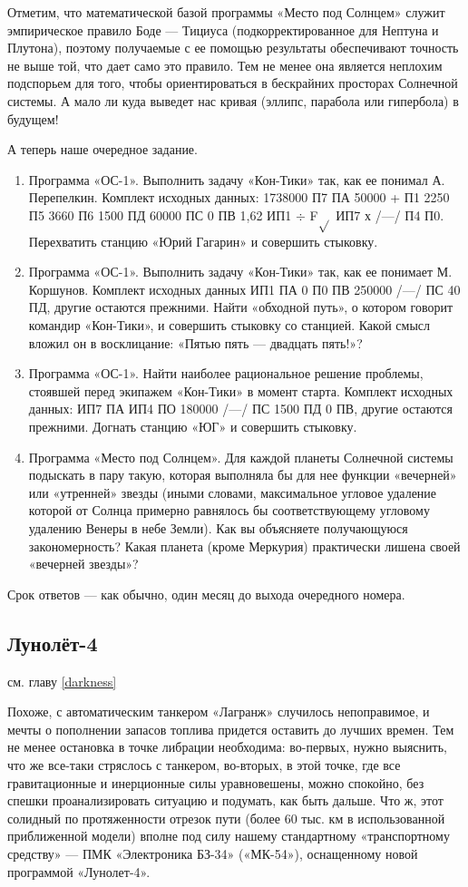\documentclass[11pt,a4paper,oneside]{article}
\begin{document}
Отметим, что математической базой программы «Место под Солнцем» служит эмпирическое правило Боде — Тициуса (подкорректированное для Нептуна и Плутона), поэтому получаемые с ее помощью результаты обеспечивают точность не выше той, что дает само это правило. Тем не менее она является неплохим подспорьем для того, чтобы ориентироваться в бескрайних просторах Солнечной системы. А мало ли куда выведет нас кривая (эллипс, парабола или гипербола) в будущем!

А теперь наше очередное задание.

\begin{enumerate}
\item Программа «ОС-1». Выполнить задачу «Кон-Тики» так, как ее понимал А. Перепелкин. Комплект исходных данных: 1738000 П7 ПА 50000 + П1 2250 П5 3660 П6 1500 ПД 60000 ПС 0 ПВ 1,62 ИП1 $\div$ F$\sqrt{}$ ИП7 х /—/ П4 П0. Перехватить станцию «Юрий Гагарин» и совершить стыковку.
\item Программа «ОС-1». Выполнить задачу «Кон-Тики» так, как ее понимает М. Коршунов. Комплект исходных данных ИП1 ПА 0 П0 ПВ 250000 /—/ ПС 40 ПД, другие остаются прежними. Найти «обходной путь», о котором говорит командир «Кон-Тики», и совершить стыковку со станцией. Какой смысл вложил он в восклицание: «Пятью пять — двадцать пять!»?
\item Программа «ОС-1». Найти наиболее рациональное решение проблемы, стоявшей перед экипажем «Кон-Тики» в момент старта. Комплект исходных данных: ИП7 ПА ИП4 ПО 180000 /—/ ПС 1500 ПД 0 ПВ, другие остаются прежними. Догнать станцию «ЮГ» и совершить стыковку.
\item Программа «Место под Солнцем». Для каждой планеты Солнечной системы подыскать в пару такую, которая выполняла бы для нее функции «вечерней» или «утренней» звезды (иными словами, максимальное угловое удаление которой от Солнца примерно равнялось бы соответствующему угловому удалению Венеры в небе Земли). Как вы объясняете получающуюся закономерность? Какая планета (кроме Меркурия) практически лишена своей «вечерней звезды»?
\end{enumerate}

Срок ответов — как обычно, один месяц до выхода очередного номера.

\subsection{Лунолёт-4}
см. главу \ref{darkness}

Похоже, с автоматическим танкером «Лагранж» случилось непоправимое, и мечты о пополнении запасов топлива придется оставить до лучших времен. Тем не менее остановка в точке либрации необходима: во-первых, нужно выяснить, что же все-таки стряслось с танкером, во-вторых, в этой точке, где все гравитационные и инерционные силы уравновешены, можно спокойно, без спешки проанализировать ситуацию и подумать, как быть дальше. Что ж, этот солидный по протяженности отрезок пути (более 60 тыс. км в использованной приближенной модели) вполне под силу нашему стандартному «транспортному средству» — ПМК «Электроника БЗ-34» («МК-54»), оснащенному новой программой «Лунолет-4».
\end{document}
